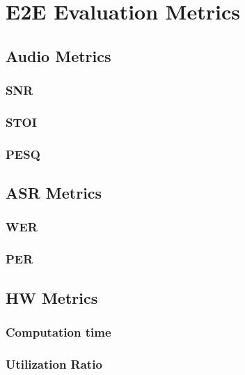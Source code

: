 \chapter{E2E Evaluation Metrics}
\section{Audio Metrics}
\subsection{SNR}
\subsection{STOI}
\subsection{PESQ}

\section{ASR Metrics}
\subsection{WER}
\subsection{PER}

\section{HW Metrics}
\subsection{Computation time}
\subsection{Utilization Ratio}
